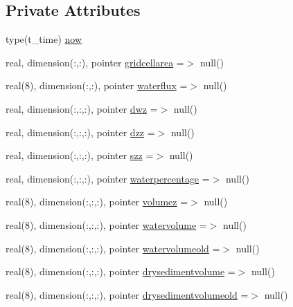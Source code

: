 \subsection*{Private Attributes}
\begin{DoxyCompactItemize}
\item 
type(t\+\_\+time) \mbox{\hyperlink{structmodulesedimentproperties_1_1t__external_a67dc1eaaa1dceee266ad2d3e477cdfc5}{now}}
\item 
real, dimension(\+:,\+:), pointer \mbox{\hyperlink{structmodulesedimentproperties_1_1t__external_a1a321052b0c3e3190af3216066616061}{gridcellarea}} =$>$ null()
\item 
real(8), dimension(\+:,\+:), pointer \mbox{\hyperlink{structmodulesedimentproperties_1_1t__external_afce9f946d0a4f2e9071cd20d2e5b292f}{waterflux}} =$>$ null()
\item 
real, dimension(\+:,\+:,\+:), pointer \mbox{\hyperlink{structmodulesedimentproperties_1_1t__external_a859662961dfce3a73318db6948d8609d}{dwz}} =$>$ null()
\item 
real, dimension(\+:,\+:,\+:), pointer \mbox{\hyperlink{structmodulesedimentproperties_1_1t__external_a346cd65cac60be7b0196cdc04bc4e8bf}{dzz}} =$>$ null()
\item 
real, dimension(\+:,\+:,\+:), pointer \mbox{\hyperlink{structmodulesedimentproperties_1_1t__external_a9a9a68de780d40a7aa6687226099fb23}{szz}} =$>$ null()
\item 
real, dimension(\+:,\+:,\+:), pointer \mbox{\hyperlink{structmodulesedimentproperties_1_1t__external_a0432287ce1b58289ed338f2985b6479b}{waterpercentage}} =$>$ null()
\item 
real(8), dimension(\+:,\+:,\+:), pointer \mbox{\hyperlink{structmodulesedimentproperties_1_1t__external_a1c7958e20bd0db6cd2d9fffed38c142c}{volumez}} =$>$ null()
\item 
real(8), dimension(\+:,\+:,\+:), pointer \mbox{\hyperlink{structmodulesedimentproperties_1_1t__external_a8919ed4c98804bdfc5a411e44b54dc51}{watervolume}} =$>$ null()
\item 
real(8), dimension(\+:,\+:,\+:), pointer \mbox{\hyperlink{structmodulesedimentproperties_1_1t__external_acb8609dadb84cf14f9f608024496e076}{watervolumeold}} =$>$ null()
\item 
real(8), dimension(\+:,\+:,\+:), pointer \mbox{\hyperlink{structmodulesedimentproperties_1_1t__external_afcd7822649cc9563147d70160bcd5fbd}{drysedimentvolume}} =$>$ null()
\item 
real(8), dimension(\+:,\+:,\+:), pointer \mbox{\hyperlink{structmodulesedimentproperties_1_1t__external_a5a1affcc9d626febcec9a433ffb8f0a7}{drysedimentvolumeold}} =$>$ null()

\end{DoxyCompactItemize}

